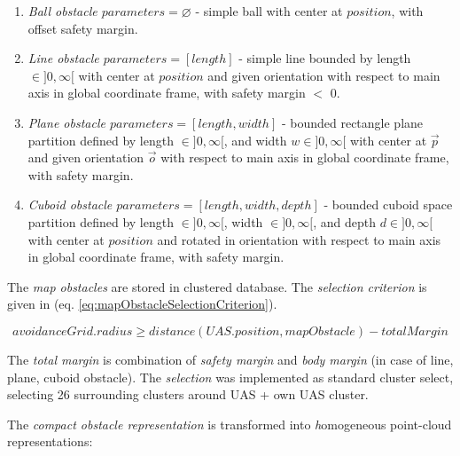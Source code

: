 \begin{enumerate}
    \item\emph{Ball obstacle $parameters=\varnothing$} - simple ball with center at $position$, with offset safety margin.
    
    \item\emph{Line obstacle $parameters=[length]$} - simple line bounded by length $\in]0,\infty[$ with center at $position$ and given orientation with respect to main axis in global coordinate frame, with safety margin $<$ 0.
    
    \item\emph{Plane obstacle $parameters=[length,width]$} - bounded rectangle plane partition defined by length $\in]0,\infty[$, and width $w\in]0,\infty[$ with center at $\vec{p}$ and given orientation $\vec{o}$ with respect to main axis in global coordinate frame, with safety margin.
    
    \item\emph{Cuboid obstacle $parameters=[length,width,depth]$} - bounded cuboid space partition defined by length $\in]0,\infty[$, width $\in]0,\infty[$, and depth $d\in]0,\infty[$ with center at $position$ and rotated in orientation with respect to main axis in global coordinate frame, with safety margin.
\end{enumerate}

\noindent The \emph{map obstacles} are stored in clustered database. The \emph{selection criterion} is given in (eq. \ref{eq:mapObstacleSelectionCriterion}).

\begin{equation}\label{eq:mapObstacleSelectionCriterion}
    avoidance Grid.radius \ge distance(UAS.position,map Obstacle) - total Margin
\end{equation}

\noindent The \emph{total margin} is combination of \emph{safety margin} and \emph{body margin} (in case of line, plane, cuboid obstacle). The \emph{selection} was implemented as standard cluster select, selecting 26  surrounding clusters around UAS + own UAS cluster.

\noindent The \emph{compact obstacle representation} is transformed into \emph homogeneous point-cloud representations:

